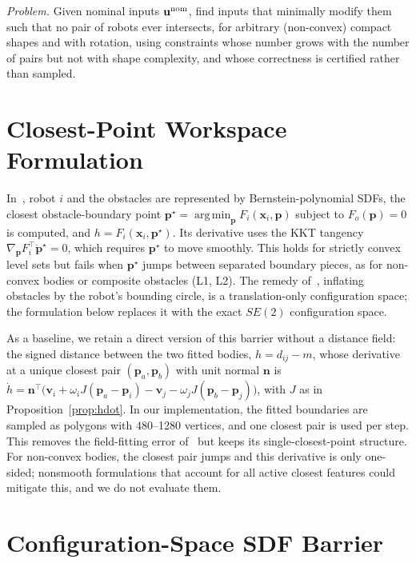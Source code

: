 \documentclass[journal]{IEEEtran}
\theoremstyle{definition}
\DeclareMathOperator*{\argmin}{arg\,min}
\begin{document}
\emph{Problem.} Given nominal inputs $\mathbf u^{\rm nom}$, find inputs that minimally modify them
such that no pair of robots ever intersects, for arbitrary (non-convex) compact shapes and with
rotation, using constraints whose number grows with the number of pairs but not with shape
complexity, and whose correctness is certified rather than sampled.

\section{Closest-Point Workspace Formulation}\label{sec:workspace}
In~\cite{jo2026geometry}, robot $i$ and the obstacles are represented by Bernstein-polynomial SDFs,
the closest obstacle-boundary point $\mathbf p^\star=\argmin_{\mathbf p}F_i(\mathbf x_i,\mathbf p)$
subject to $F_o(\mathbf p)=0$ is computed, and $h=F_i(\mathbf x_i,\mathbf p^\star)$. Its derivative
uses the KKT tangency $\nabla_{\mathbf p}F_i^\top\dot{\mathbf p}^\star=0$, which requires
$\mathbf p^\star$ to move smoothly. This holds for strictly convex level sets but fails when
$\mathbf p^\star$ jumps between separated boundary pieces, as for non-convex bodies or composite
obstacles (L1, L2). The remedy of~\cite{jo2026geometry}, inflating obstacles by the robot's bounding
circle, is a translation-only configuration space; the formulation below replaces it with the exact
$SE(2)$ configuration space.

As a baseline, we retain a direct version of this barrier without a distance field: the signed
distance between the two fitted bodies, $h=d_{ij}-m$, whose derivative at a unique closest pair
$(\mathbf p_a,\mathbf p_b)$ with unit normal $\mathbf n$ is
$\dot h=\mathbf n^\top\big(\mathbf v_i+\omega_iJ(\mathbf p_a-\mathbf p_i)-\mathbf v_j
-\omega_jJ(\mathbf p_b-\mathbf p_j)\big)$, with $J$ as in Proposition~\ref{prop:hdot}. In our
implementation, the fitted boundaries are sampled as polygons with 480--1280 vertices, and one
closest pair is used per step. This removes the field-fitting error of~\cite{jo2026geometry} but
keeps its single-closest-point structure. For non-convex bodies, the closest pair jumps and this
derivative is only one-sided; nonsmooth formulations that account for all active closest features
could mitigate this, and we do not evaluate them.

\section{Configuration-Space SDF Barrier}\label{sec:cspace}
\end{document}
